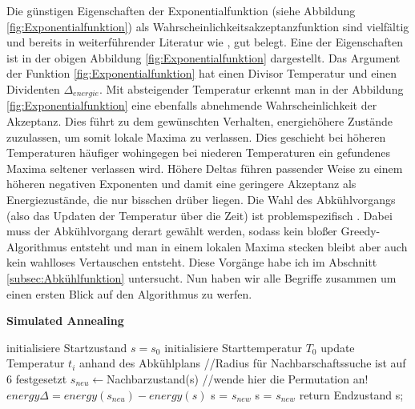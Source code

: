Die günstigen Eigenschaften der Exponentialfunktion (siehe Abbildung \ref{fig:Exponentialfunktion}) als Wahrscheinlichkeitsakzeptanzfunktion sind vielfältig und bereits in weiterführender Literatur wie 
\cite{Kirkpatrick671},\cite{van1987simulated} gut belegt. Eine der Eigenschaften ist in der obigen Abbildung \ref{fig:Exponentialfunktion} dargestellt. Das Argument der Funktion 
\ref{fig:Exponentialfunktion} hat einen Divisor Temperatur und einen Dividenten $\Delta_{energie}$. Mit absteigender Temperatur erkennt man 
in der Abbildung \ref{fig:Exponentialfunktion} eine ebenfalls abnehmende Wahrscheinlichkeit der Akzeptanz. Dies führt zu dem gewünschten Verhalten, energiehöhere Zustände 
zuzulassen, um somit lokale Maxima zu verlassen. Dies geschieht bei höheren Temperaturen häufiger wohingegen bei niederen Temperaturen ein gefundenes Maxima
seltener verlassen wird. Höhere Deltas führen passender Weise zu einem höheren negativen Exponenten und damit eine geringere Akzeptanz als Energiezustände, die nur bisschen 
drüber liegen. Die Wahl des Abkühlvorgangs (also das Updaten der Temperatur über die Zeit) ist problemspezifisch \cite[S. 9]{Kirkpatrick671}. Dabei muss der Abkühlvorgang derart
gewählt werden, sodass kein bloßer Greedy-Algorithmus entsteht und man in einem lokalen Maxima stecken bleibt aber auch kein wahlloses Vertauschen entsteht. Diese Vorgänge habe 
ich im Abschnitt \ref{subsec:Abkühlfunktion} untersucht. Nun haben wir alle Begriffe zusammen um einen ersten Blick auf den Algorithmus zu werfen.

\begin{tcolorbox}
\begin{algorithm}[H]
    \caption{\textbf{Simulated Annealing}}
    \begin{algorithmic}[1]
        \State initialisiere Startzustand $s=s_{0}$
        \State initialisiere Starttemperatur $T_0$
        \State update Temperatur $t_i$ anhand des Abkühlplans
        \State //Radius für Nachbarschaftssuche ist auf 6 festgesetzt
        \State $s_{neu}\leftarrow$Nachbarzustand(s) //wende hier die Permutation an!
        \State $energy\Delta = energy(s_{neu}) - energy(s)$
        \State s = $s_{new}$
        \Else{}
        \State s = $s_{new}$
        \EndIf
        \EndIf
        \EndFor
        \State return Endzustand s;
    \end{algorithmic}
    \label{alg:retargeting}
\end{algorithm}
\end{tcolorbox}

